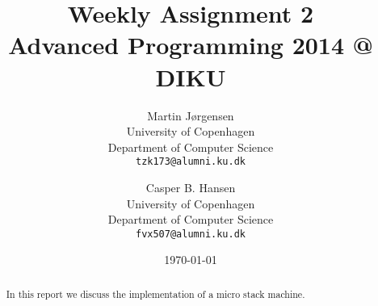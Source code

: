 \documentclass[a4paper,11pt]{article}
\title
{
    {\Large Weekly Assignment 2} \\
    Advanced Programming 2014 @ DIKU
}
\author
{
    Martin Jørgensen \\
    University of Copenhagen \\
    Department of Computer Science \\
    {\tt tzk173@alumni.ku.dk}
    \and
    Casper B. Hansen \\
    University of Copenhagen \\
    Department of Computer Science \\
    {\tt fvx507@alumni.ku.dk}
}
\date{\today}
\begin{document}
\maketitle
\thispagestyle{empty}
\begin{multicols}{2}
    \begin{abstract}
        In this report we discuss the implementation of a micro stack machine.
    \end{abstract}
    \vfill{\ }\columnbreak
    \tableofcontents
\end{multicols}
\clearpage










%
\end{document}
